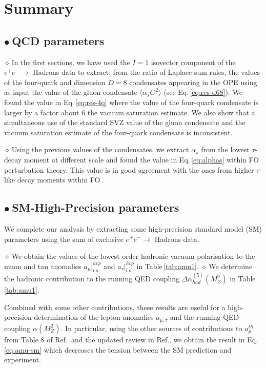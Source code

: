 \documentclass[review]{elsarticle}
\def\la{\langle}
\def\ra{\rangle}
\def\b{$\bullet~$}
\def\d{$\diamond~$}
\begin{document}
\section{Summary}
\subsection*{\b QCD parameters}

\d In the first sections, we have used the $I=1$ isovector component of the $e^+e^-\to$ Hadrons data to extract, from the ratio of Laplace sum rules, the values of the four-quark and dimension $D=8$ condensates appearing in the OPE using as input the value of the gluon condensate $\la\alpha_s G^2\ra$ (see Eq.\,\ref{eq:res-d68}).  We found the value in Eq.\,\ref{eq:res-4q} where the value of the four-quark condensate is larger by a factor about 6 the vacuum saturation estimate. We also show that a simultaneous use of the standard SVZ value of the gluon condensate and the vacuum saturation estimate of the four-quark condensate is inconsistent. 

\d Using the previous values of the condensates, we extract $\alpha_s$ from the lowest $\tau$-decay moment at different scale and found the value in Eq.\,\ref{eq:alphas} within FO perturbation theory. This value is in good agreement with the ones from higher $\tau$-like decay moments within FO\,\cite{PICH2}. 

\subsection*{\b SM-High-Precision parameters}
We complete our analysis by extracting some high-precision standard model (SM) parameters using the sum of exclusive $e^+e^-\to$ Hadrons data.

\d We obtain the values of the lowest order hadronic vacuum polarisation to the muon and tau anomalies $a_\mu\vert^{hvp}_{l.o}$ and $a_\tau\vert^{hvp}_{l.o}$ in Table\,\ref{tab:amu1}. 
\d We determine the hadronic contribution  to the running QED coupling $ \Delta \alpha_{had}^{(5)} (M_Z^2)$ in Table\,\ref{tab:amu1}. 

Combined with some other contributions, these results are useful for a high-precision determination of the lepton anomalies $a_{\mu,\tau}$ and the running QED coupling $\alpha(M_Z^2)$.  In particular, using  the other sources of contributions to $a_\mu^{th}$ from Table 8 of Ref.\,\cite{KNECHT} and the updated review in Ref.\cite{GM2}, we obtain the result in Eq.\,\ref{eq:amu-sm} which decreases the tension between the SM prediction and experiment.  


\end{document}
